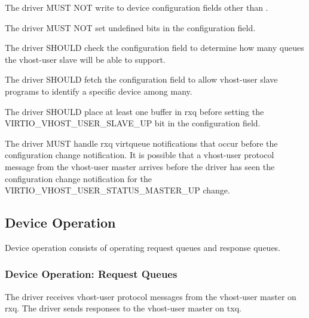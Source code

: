 
The driver MUST NOT write to device configuration fields other than
.

The driver MUST NOT set undefined bits in the  configuration field.


The driver SHOULD check the  configuration field to
determine how many queues the vhost-user slave will be able to support.

The driver SHOULD fetch the  configuration field to allow
vhost-user slave programs to identify a specific device among many.

The driver SHOULD place at least one buffer in rxq before setting the
VIRTIO_VHOST_USER_SLAVE_UP bit in the  configuration field.

The driver MUST handle rxq virtqueue notifications that occur before the
configuration change notification.  It is possible that a vhost-user protocol
message from the vhost-user master arrives before the driver has seen the
configuration change notification for the VIRTIO_VHOST_USER_STATUS_MASTER_UP
 change.

\subsection{Device Operation}\label{sec:Device Types / Vhost-user Device Backend / Device Operation}

Device operation consists of operating request queues and response queues.

\subsubsection{Device Operation: Request Queues}\label{sec:Device Types / Vhost-user Device Backend / Device Operation / Device Operation: Request Queues}

The driver receives vhost-user protocol messages from the vhost-user master on
rxq.  The driver sends responses to the vhost-user master on txq.

